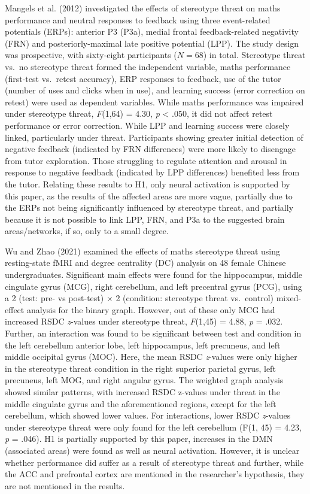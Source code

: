 \documentclass[
  stu, a4paper,floatsintext]{apa7}
\begin{document}
Mangels et al. (2012) investigated the effects of stereotype threat on maths performance and neutral responses to feedback using three event-related potentials (ERPs): anterior P3 (P3a), medial frontal feedback-related negativity (FRN) and posteriorly-maximal late positive potential (LPP).
The study design was prospective, with sixty-eight participants (\(N = 68\)) in total.
Stereotype threat vs.~no stereotype threat formed the independent variable, maths performance (first-test vs.~retest accuracy), ERP responses to feedback, use of the tutor (number of uses and clicks when in use), and learning success (error correction on retest) were used as dependent variables.
While maths performance was impaired under stereotype threat, \emph{F}(1,64) = 4.30, \emph{p} \textless{} .050, it did not affect retest performance or error correction.
While LPP and learning success were closely linked, particularly under threat.
Participants showing greater initial detection of negative feedback (indicated by FRN differences) were more likely to disengage from tutor exploration.
Those struggling to regulate attention and arousal in response to negative feedback (indicated by LPP differences) benefited less from the tutor.
Relating these results to H1, only neural activation is supported by this paper, as the results of the affected areas are more vague, partially due to the ERPs not being significantly influenced by stereotype threat, and partially because it is not possible to link LPP, FRN, and P3a to the suggested brain areas/networks, if so, only to a small degree.

Wu and Zhao (2021) examined the effects of maths stereotype threat using resting-state fMRI and degree centrality (DC) analysis on 48 female Chinese undergraduates.
Significant main effects were found for the hippocampus, middle cingulate gyrus (MCG), right cerebellum, and left precentral gyrus (PCG), using a 2 (test: pre- vs post-test) \(\times\) 2 (condition: stereotype threat vs.~control) mixed-effect analysis for the binary graph.
However, out of these only MCG had increased RSDC \emph{z}-values under stereotype threat, \emph{F}(1,45) = 4.88, \emph{p} = .032.
Further, an interaction was found to be significant between test and condition in the left cerebellum anterior lobe, left hippocampus, left precuneus, and left middle occipital gyrus (MOC).
Here, the mean RSDC \emph{z}-values were only higher in the stereotype threat condition in the right superior parietal gyrus, left precuneus, left MOG, and right angular gyrus.
The weighted graph analysis showed similar patterns, with increased RSDC z-values under threat in the middle cingulate gyrus and the aforementioned regions, except for the left cerebellum, which showed lower values.
For interactions, lower RSDC \emph{z}-values under stereotype threat were only found for the left cerebellum (F(1, 45) = 4.23, \emph{p} = .046).
H1 is partially supported by this paper, increases in the DMN (associated areas) were found as well as neural activation. However, it is unclear whether performance did suffer as a result of stereotype threat and further, while the ACC and prefrontal cortex are mentioned in the researcher's hypothesis, they are not mentioned in the results.
\end{document}
